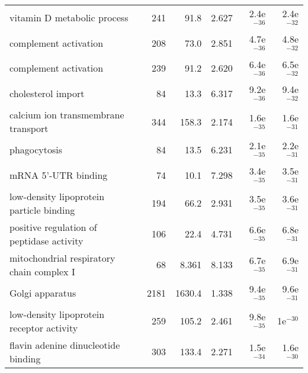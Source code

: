 \begin{longtable}{lrrrrr}
                       vitamin D metabolic process &                     241 &                    91.8 &      2.627 &         2.4e$^{-36}$ &         2.4e$^{-32}$ \\
                             complement activation &                     208 &                    73.0 &      2.851 &         4.7e$^{-36}$ &         4.8e$^{-32}$ \\
                             complement activation &                     239 &                    91.2 &      2.620 &         6.4e$^{-36}$ &         6.5e$^{-32}$ \\
                                cholesterol import &                      84 &                    13.3 &      6.317 &         9.2e$^{-36}$ &         9.4e$^{-32}$ \\
               calcium ion transmembrane transport &                     344 &                   158.3 &      2.174 &         1.6e$^{-35}$ &         1.6e$^{-31}$ \\
                                      phagocytosis &                      84 &                    13.5 &      6.231 &         2.1e$^{-35}$ &         2.2e$^{-31}$ \\
                               mRNA 5'-UTR binding &                      74 &                    10.1 &      7.298 &         3.4e$^{-35}$ &         3.5e$^{-31}$ \\
          low-density lipoprotein particle binding &                     194 &                    66.2 &      2.931 &         3.5e$^{-35}$ &         3.6e$^{-31}$ \\
         positive regulation of peptidase activity &                     106 &                    22.4 &      4.731 &         6.6e$^{-35}$ &         6.8e$^{-31}$ \\
         mitochondrial respiratory chain complex I &                      68 &                   8.361 &      8.133 &         6.7e$^{-35}$ &         6.9e$^{-31}$ \\
                                   Golgi apparatus &                    2181 &                  1630.4 &      1.338 &         9.4e$^{-35}$ &         9.6e$^{-31}$ \\
         low-density lipoprotein receptor activity &                     259 &                   105.2 &      2.461 &         9.8e$^{-35}$ &           1e$^{-30}$ \\
               flavin adenine dinucleotide binding &                     303 &                   133.4 &      2.271 &         1.5e$^{-34}$ &         1.6e$^{-30}$ \\

\end{longtable}
